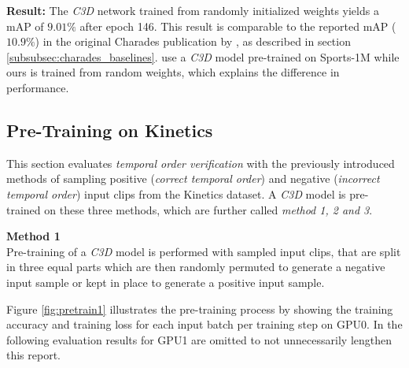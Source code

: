 \textbf{Result:}
The \textit{C3D} network trained from randomly initialized weights yields a mAP of $9.01\%$ after epoch 146.
This result is comparable to the reported mAP ($10.9\%$) in the original Charades publication by \textcite{sigurdsson_hollywood_2016}, as described in section \ref{subsubsec:charades_baselines}.
\textcite{sigurdsson_hollywood_2016} use a \textit{C3D} model pre-trained on Sports-1M\cite{karpathy_large-scale_2014} while ours is trained from random weights, which explains the difference in performance.

\subsection{Pre-Training on Kinetics}
This section evaluates \textit{temporal order verification} with the previously introduced methods of sampling positive (\textit{correct temporal order}) and negative (\textit{incorrect temporal order}) input clips from the Kinetics dataset.
A \textit{C3D} model is pre-trained on these three methods, which are further called \textit{method 1, 2 and 3}.
\bigskip

\textbf{Method 1}\\
Pre-training of a \textit{C3D} model is performed with sampled input clips, that are split in three equal parts which are then randomly permuted to generate a negative input sample or kept in place to generate a positive input sample.

Figure \ref{fig:pretrain1} illustrates the pre-training process by showing the training accuracy and training loss for each input batch per training step on GPU0.
In the following evaluation results for GPU1 are omitted to not unnecessarily lengthen this report.

